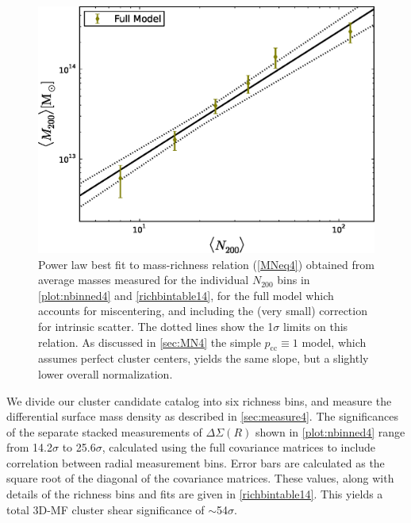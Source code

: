 \begin{figure}
\begin{center}
  \includegraphics[scale=0.7]{plots_ch4/MassRich_shear_FullModelOnly_DuttonMaccio_IntrinsicScatter.eps}
  \caption[Mass-Richness Relation from Shear]{Power law best fit to mass-richness relation (\autoref{MNeq4}) obtained from average masses measured for the individual $N_{200}$ bins in \autoref{plot:nbinned4} and \autoref{richbintable14}, for the full model which accounts for miscentering, and including the (very small) correction for intrinsic scatter. The dotted lines show the 1$\sigma$ limits on this relation. As discussed in \autoref{sec:MN4} the simple $p_{\mathrm{cc}} \equiv 1$ model, which assumes perfect cluster centers, yields the same slope, but a slightly lower overall normalization.}
\label{plot:massrich4}
\end{center}
\end{figure}


We divide our cluster candidate catalog into six richness bins, and measure the differential surface mass density as described in \autoref{sec:measure4}. The significances of the separate stacked measurements of $\Delta\Sigma(R)$ shown in \autoref{plot:nbinned4} range from 14.2$\sigma$ to 25.6$\sigma$, calculated using the full covariance matrices to include correlation between radial measurement bins. Error bars are calculated as the square root of the diagonal of the covariance matrices. These values, along with details of the richness bins and fits are given in \autoref{richbintable14}. This yields a total \ac{3D-MF} cluster shear significance of $\sim$54$\sigma$. 

